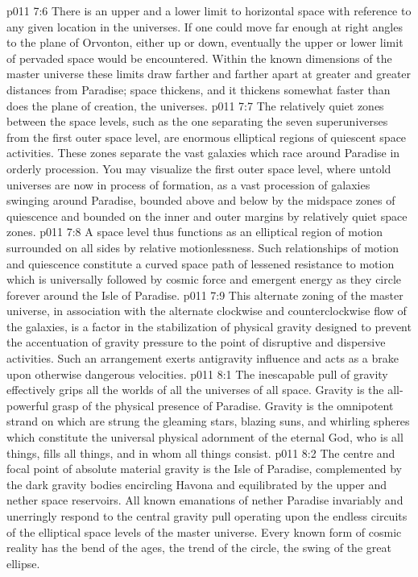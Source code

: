 \vs p011 7:6 There is an upper and a lower limit to horizontal space with reference to any given location in the universes. If one could move far enough at right angles to the plane of Orvonton, either up or down, eventually the upper or lower limit of pervaded space would be encountered. Within the known dimensions of the master universe these limits draw farther and farther apart at greater and greater distances from Paradise; space thickens, and it thickens somewhat faster than does the plane of creation, the universes.
\vs p011 7:7 \pc The relatively quiet zones between the space levels, such as the one separating the seven superuniverses from the first outer space level, are enormous elliptical regions of quiescent space activities. These zones separate the vast galaxies which race around Paradise in orderly procession. You may visualize the first outer space level, where untold universes are now in process of formation, as a vast procession of galaxies swinging around Paradise, bounded above and below by the midspace zones of quiescence and bounded on the inner and outer margins by relatively quiet space zones.
\vs p011 7:8 A space level thus functions as an elliptical region of motion surrounded on all sides by relative motionlessness. Such relationships of motion and quiescence constitute a curved space path of lessened resistance to motion which is universally followed by cosmic force and emergent energy as they circle forever around the Isle of Paradise.
\vs p011 7:9 This alternate zoning of the master universe, in association with the alternate clockwise and counterclockwise flow of the galaxies, is a factor in the stabilization of physical gravity designed to prevent the accentuation of gravity pressure to the point of disruptive and dispersive activities. Such an arrangement exerts antigravity influence and acts as a brake upon otherwise dangerous velocities.
\vs p011 8:1 The inescapable pull of gravity effectively grips all the worlds of all the universes of all space. Gravity is the all\hyp{}powerful grasp of the physical presence of Paradise. Gravity is the omnipotent strand on which are strung the gleaming stars, blazing suns, and whirling spheres which constitute the universal physical adornment of the eternal God, who is all things, fills all things, and in whom all things consist.
\vs p011 8:2 The centre and focal point of absolute material gravity is the Isle of Paradise, complemented by the dark gravity bodies encircling Havona and equilibrated by the upper and nether space reservoirs. All known emanations of nether Paradise invariably and unerringly respond to the central gravity pull operating upon the endless circuits of the elliptical space levels of the master universe. Every known form of cosmic reality has the bend of the ages, the trend of the circle, the swing of the great ellipse.
